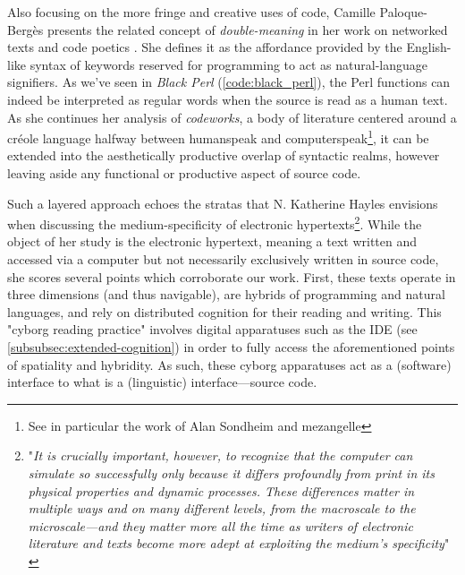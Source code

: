 Also focusing on the more fringe and creative uses of code, Camille Paloque-Bergès presents the related concept of \emph{double-meaning} in her work on networked texts and code poetics \citep{paloque-berges_poetique_2009}. She defines it as the affordance provided by the English-like syntax of keywords reserved for programming to act as natural-language signifiers. As we've seen in \emph{Black Perl} (\autoref{code:black_perl}), the Perl functions can indeed be interpreted as regular words when the source is read as a human text. As she continues her analysis of \emph{codeworks}, a body of literature centered around a créole language halfway between humanspeak and computerspeak\footnote{See in particular the work of Alan Sondheim and mezangelle}, it can be extended into the aesthetically productive overlap of syntactic realms, however leaving aside any functional or productive aspect of source code.

Such a layered approach echoes the stratas that N. Katherine Hayles envisions when discussing the medium-specificity of electronic hypertexts\footnote{"\emph{It is crucially important, however, to recognize that the computer can simulate so successfully only because it differs profoundly from print in its physical properties and dynamic processes. These differences matter in multiple ways and on many different levels, from the macroscale to the microscale—and they matter more all the time as writers of electronic literature and texts become more adept at exploiting the medium’s specificity}" \citep{hayles_print_2004}}. While the object of her study is the electronic hypertext, meaning a text written and accessed via a computer but not necessarily exclusively written in source code, she scores several points which corroborate our work. First, these texts operate in three dimensions (and thus navigable), are hybrids of programming and natural languages, and rely on distributed cognition for their reading and writing. This "cyborg reading practice" involves digital apparatuses such as the IDE (see \ref{subsubsec:extended-cognition}) in order to fully access the aforementioned points of spatiality and hybridity. As such, these cyborg apparatuses act as a (software) interface to what is a (linguistic) interface—source code.

